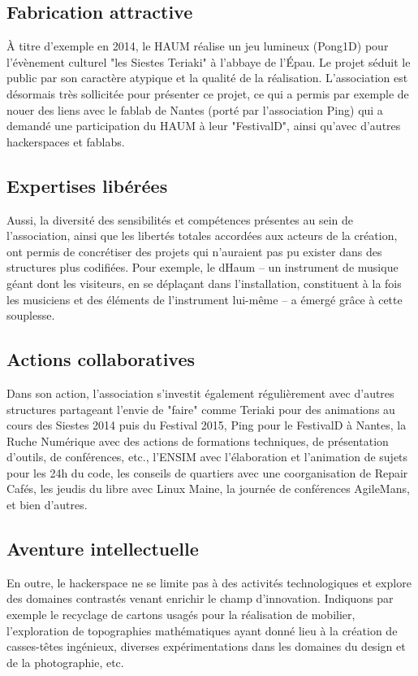 \documentclass[a4paper,10pt]{scrartcl}
\begin{document}
\subsection*{Fabrication attractive}
À titre d'exemple en 2014, le HAUM réalise un jeu lumineux (Pong1D) pour l'évènement culturel "les Siestes Teriaki" à l'abbaye de l'Épau. Le projet séduit le public par son caractère atypique et la qualité de la réalisation. L'association est désormais très sollicitée pour présenter ce projet, ce qui a permis par exemple de nouer des liens avec le fablab de Nantes (porté par l'association Ping) qui a demandé une participation du HAUM à leur "FestivalD", ainsi qu'avec d'autres hackerspaces et fablabs.

\subsection*{Expertises libérées}
Aussi, la diversité des sensibilités et compétences présentes au sein de l'association, ainsi que les libertés totales accordées aux acteurs de la création, ont permis de concrétiser des projets qui n'auraient pas pu exister dans des structures plus codifiées.
Pour exemple, le dHaum -- un instrument de musique géant dont les visiteurs, en se déplaçant dans l’installation, constituent à la fois les musiciens et des éléments de l'instrument lui-même -- a émergé grâce à cette souplesse.

\subsection*{Actions collaboratives}
Dans son action, l'association s'investit également régulièrement avec d'autres structures partageant l'envie de "faire" comme Teriaki pour des animations au cours des Siestes 2014 puis du Festival 2015, Ping pour le FestivalD à Nantes, la Ruche Numérique avec des actions de formations techniques, de présentation d'outils, de conférences, etc., l'ENSIM avec l'élaboration et l'animation de sujets pour les 24h du code, les conseils de quartiers avec une coorganisation de Repair Cafés, les jeudis du libre avec Linux Maine, la journée de conférences AgileMans, et bien d'autres.

\subsection*{Aventure intellectuelle}
En outre, le hackerspace ne se limite pas à des activités technologiques et explore des domaines contrastés venant enrichir le champ d'innovation. Indiquons par exemple le recyclage de cartons usagés pour la réalisation de mobilier, l'exploration de topographies mathématiques ayant donné lieu à la création de casses-têtes ingénieux, diverses expérimentations dans les domaines du design et de la photographie, etc.
\end{document}
